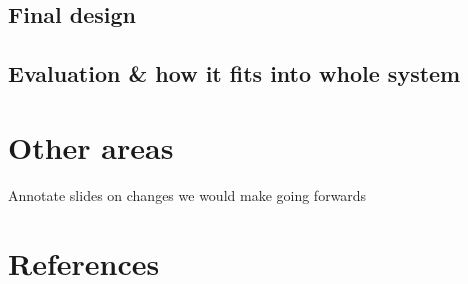 \documentclass{article}
\begin{document}
\subsection{Final design}
\subsection{Evaluation \& how it fits into whole system}
\section{Other areas}
Annotate slides on changes we would make going forwards
\section{References}
\end{document}

